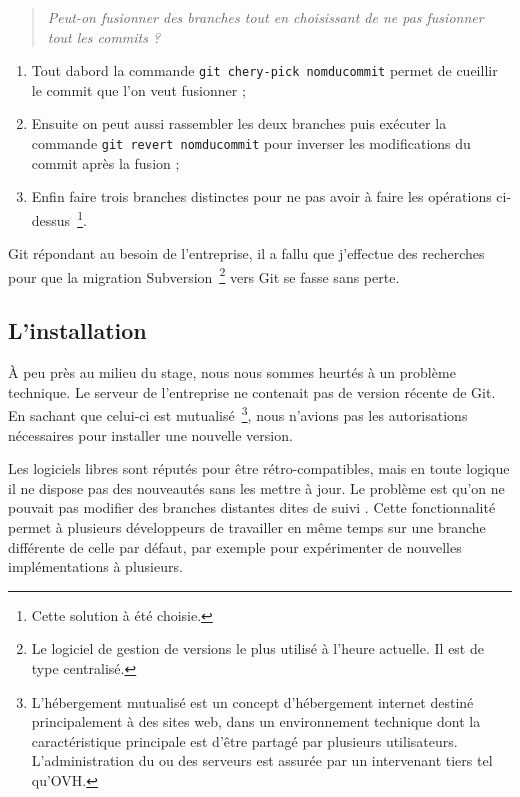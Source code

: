 \begin{quote}
    \emph{Peut-on fusionner des branches tout en choisissant de ne pas
    fusionner tout les commits ?}
\end{quote}

\begin{enumerate}
    \item Tout dabord la commande \texttt{git chery-pick nomducommit} permet
    de \og cueillir \fg{} le commit que l'on veut fusionner ;
    \item Ensuite on peut aussi rassembler les deux branches puis exécuter la
    commande \texttt{git revert nomducommit} pour inverser les modifications
    du commit après la fusion ;
    \item Enfin faire trois branches distinctes pour ne pas avoir à faire les
    opérations ci-dessus\, \footnote{Cette solution à été choisie.}.
\end{enumerate}

Git répondant au besoin de l'entreprise, il a fallu que j'effectue des
recherches pour que la migration Subversion\, \footnote{Le logiciel de gestion
de versions le plus utilisé à l'heure actuelle. Il est de type centralisé.}
vers Git se fasse sans perte.

\subsection{L'installation} %
\label{sub:L'installation}

À peu près au milieu du stage, nous nous sommes heurtés à un problème
technique. Le serveur de l'entreprise ne contenait pas de version récente de
Git. En sachant que celui-ci est mutualisé\, \footnote{L'hébergement mutualisé
est un concept d'hébergement internet destiné principalement à des sites web,
dans un environnement technique dont la caractéristique principale est d'être
partagé par plusieurs utilisateurs. L'administration du ou des serveurs est
assurée par un intervenant tiers tel qu'OVH.}, nous n'avions pas les
autorisations nécessaires pour installer une nouvelle version.

Les logiciels libres sont réputés pour être rétro-compatibles, mais en toute
logique il ne dispose pas des nouveautés sans les mettre à jour. Le problème
est qu'on ne pouvait pas modifier des branches distantes dites \og de suivi
\fg{}. Cette fonctionnalité permet à plusieurs développeurs de travailler en
même temps sur une branche différente de celle par défaut, par exemple pour
expérimenter de nouvelles implémentations à plusieurs.


